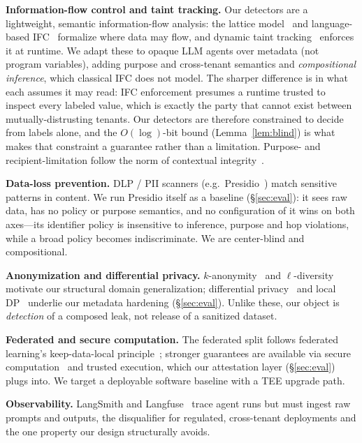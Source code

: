\documentclass[sigconf,anonymous,review]{acmart}
\theoremstyle{acmplain}
\begin{document}
\noindent\textbf{Information-flow control and taint tracking.} Our detectors are a
lightweight, semantic information-flow analysis: the lattice model~\cite{denning76}
and language-based IFC~\cite{sabelfeld03} formalize where data may flow, and
dynamic taint tracking~\cite{taintdroid} enforces it at runtime. We adapt these to
opaque LLM agents over metadata (not program variables), adding purpose and
cross-tenant semantics and \emph{compositional inference}, which classical IFC
does not model. The sharper difference is in what each assumes it may read: IFC
enforcement presumes a runtime trusted to inspect every labeled value, which is
exactly the party that cannot exist between mutually-distrusting tenants. Our
detectors are therefore constrained to decide from labels alone, and the
$O(\log)$-bit bound (Lemma~\ref{lem:blind}) is what makes that constraint a
guarantee rather than a limitation. Purpose- and recipient-limitation follow the norm of contextual
integrity~\cite{ci}.

\noindent\textbf{Data-loss prevention.} DLP / PII scanners (e.g.\
Presidio~\cite{presidio}) match sensitive patterns in content. We run Presidio
itself as a baseline (\S\ref{sec:eval}): it sees raw data, has no policy or purpose
semantics, and no configuration of it wins on both axes---its identifier policy is
insensitive to inference, purpose and hop violations, while a broad policy becomes
indiscriminate. We are center-blind and compositional.

\noindent\textbf{Anonymization and differential privacy.} $k$-anonymity~\cite{ksweeney}
and $\ell$-diversity~\cite{ldiv} motivate our structural domain generalization;
differential privacy~\cite{dwork06,dworkroth} and local DP~\cite{rappor} underlie
our metadata hardening (\S\ref{sec:eval}). Unlike these, our object is \emph{detection} of a
composed leak, not release of a sanitized dataset.

\noindent\textbf{Federated and secure computation.} The federated split follows
federated learning's keep-data-local principle~\cite{fedavg}; stronger guarantees
are available via secure computation~\cite{yao} and trusted execution, which our
attestation layer (\S\ref{sec:eval}) plugs into. We target a deployable software baseline with a
TEE upgrade path.

\noindent\textbf{Observability.} LangSmith and Langfuse~\cite{langfuse} trace
agent runs but must ingest raw prompts and outputs, the disqualifier for
regulated, cross-tenant deployments and the one property our design structurally
avoids.
\end{document}
